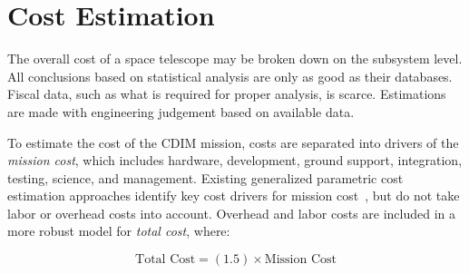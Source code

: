 \documentclass{ws-jai}
\begin{document}
\section{Cost Estimation}
\label{sec:cost}
The overall cost of a space telescope may be broken down on the subsystem level.
All conclusions based on statistical analysis are only as good as their databases.
Fiscal data, such as what is required for proper analysis, is scarce.
Estimations are made with engineering judgement based on available data.

To estimate the cost of the CDIM mission, costs are separated into drivers of the \emph{mission cost}, which includes hardware, development, ground support, integration, testing, science, and management.
Existing generalized parametric cost estimation approaches identify key cost drivers for mission cost~\cite{stahl2013,bely2011}, but do not take labor or overhead costs into account.
Overhead and labor costs are included in a more robust model for \emph{total cost}, where:

\begin{equation}
  	\text{Total Cost}=(1.5)\times\text{Mission Cost}
\label{eq:total-cost}
\end{equation}
\end{document}
